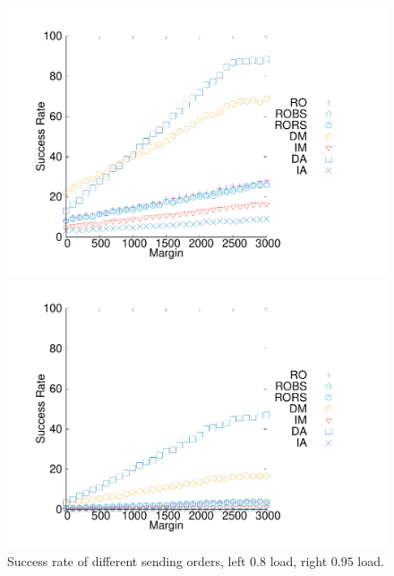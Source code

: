 \documentclass[a4paper,10pt]{journal}
\begin{document}
 
\begin{figure}[h] 
  \begin{minipage}[b]{.49\linewidth} 
\begin{center} 
  \includegraphics[width=\linewidth]{departs_gp_250001.pdf}
\end{center}

\end{minipage}
\begin{minipage}[b]{.49\linewidth}   
  \includegraphics[width=\linewidth]{departs_gp_210001.pdf}

\end{minipage}
      \caption{Success rate of different sending orders, left $0.8$ load, right $0.95$ load.}
           \label{fig:success1random}
     \end{figure}
\end{document}
